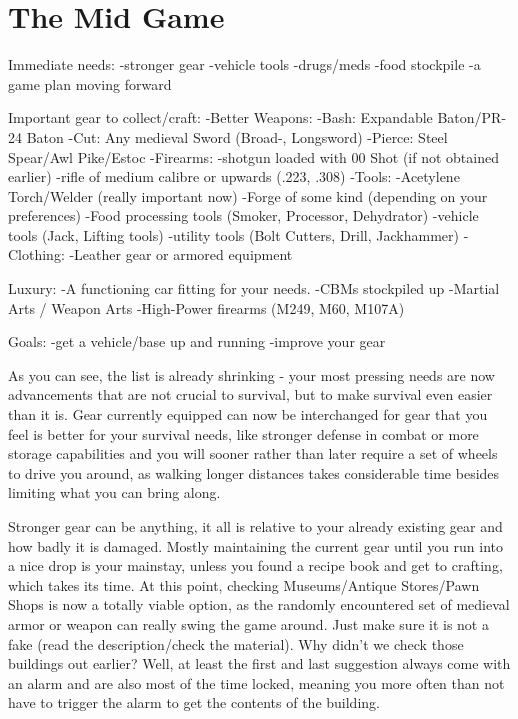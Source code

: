 \documentclass[11pt]{report}
\begin{document}
\section{The Mid Game}

Immediate needs:
-stronger gear
-vehicle tools
-drugs/meds
-food stockpile
-a game plan moving forward

Important gear to collect/craft:
-Better Weapons:
	-Bash: Expandable Baton/PR-24 Baton
	-Cut: Any medieval Sword (Broad-, Longsword)
	-Pierce: Steel Spear/Awl Pike/Estoc
-Firearms:
	-shotgun loaded with 00 Shot (if not obtained earlier)
	-rifle of medium calibre or upwards (.223, .308)
-Tools:
	-Acetylene Torch/Welder (really important now)
	-Forge of some kind (depending on your preferences)
	-Food processing tools (Smoker, Processor, Dehydrator)
	-vehicle tools (Jack, Lifting tools)
	-utility tools (Bolt Cutters, Drill, Jackhammer)
-Clothing:
	-Leather gear or armored equipment

Luxury:
-A functioning car fitting for your needs.
-CBMs stockpiled up
-Martial Arts / Weapon Arts
-High-Power firearms (M249, M60, M107A)

Goals:
-get a vehicle/base up and running
-improve your gear

As you can see, the list is already shrinking - your most pressing needs are now advancements that are not crucial to survival, but to make survival even easier than it is. Gear currently equipped can now be interchanged for gear that you feel is better for your survival needs, like stronger defense in combat or more storage capabilities and you will sooner rather than later require a set of wheels to drive you around, as walking longer distances takes considerable time besides limiting what you can bring along.

Stronger gear can be anything, it all is relative to your already existing gear and how badly it is damaged. Mostly maintaining the current gear until you run into a nice drop is your mainstay, unless you found a recipe book and get to crafting, which takes its time. At this point, checking Museums/Antique Stores/Pawn Shops is now a totally viable option, as the randomly encountered set of medieval armor or weapon can really swing the game around. Just make sure it is not a fake (read the description/check the material). Why didn't we check those buildings out earlier? Well, at least the first and last suggestion always come with an alarm and are also most of the time locked, meaning you more often than not have to trigger the alarm to get the contents of the building.
\end{document}
